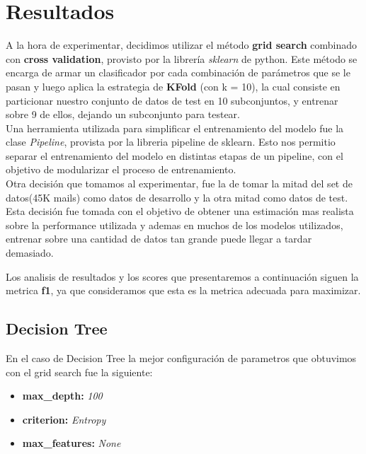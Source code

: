 \newcommand\MyBox[2]{
  \fbox{\lower0.75cm
    \vbox to 1.7cm{\vfil
      \hbox to 1.7cm{\hfil\parbox{1.4cm}{#1\\#2}\hfil}
      \vfil}%
  }%
}

\noindent
\renewcommand\arraystretch{1.5}
\setlength\tabcolsep{0pt}

\section{Resultados}
A la hora de experimentar, decidimos utilizar el método \textbf{grid search} combinado con \textbf{cross validation}, provisto por la librería \textit{sklearn} de python.
Este método se encarga de armar un clasificador por cada combinación de parámetros que se le pasan y luego aplica la estrategia de \textbf{KFold} (con k = 10), la cual
consiste en particionar nuestro conjunto de datos de test en 10 subconjuntos, y entrenar sobre 9 de ellos, dejando un subconjunto para testear.\\

Una herramienta utilizada para simplificar el entrenamiento del modelo fue la clase \textit{Pipeline}, provista por la
libreria pipeline de sklearn. Esto nos permitio separar el entrenamiento del modelo en distintas etapas de un pipeline,
con el objetivo de modularizar el proceso de entrenamiento. \\

Otra decisión que tomamos al experimentar, fue la de tomar la mitad del set de datos(45K mails) como datos de desarrollo y la otra mitad como datos
de test. Esta decisión fue tomada con el objetivo de obtener una estimación mas realista sobre la performance utilizada y ademas en muchos de los modelos
utilizados, entrenar sobre una cantidad de datos tan grande puede llegar a tardar demasiado.

Los analisis de resultados y los scores que presentaremos a continuación siguen la metrica \textbf{f1}, ya que consideramos
que esta es la metrica adecuada para maximizar.

\subsection{Decision Tree}
En el caso de Decision Tree la mejor configuración de parametros que obtuvimos con el grid search fue la siguiente:
\begin{itemize}
\item \textbf{max\_depth:} \textit{100}
\item \textbf{criterion:} \textit{Entropy}
\item \textbf{max\_features:} \textit{None}
\end{itemize}


